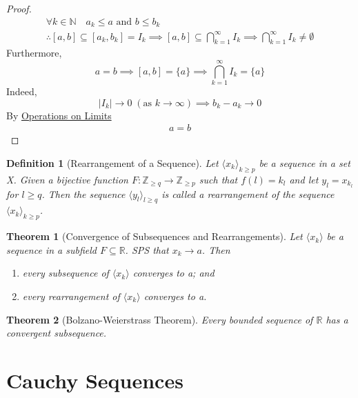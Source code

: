 \documentclass[11pt, oneside]{book}
\theoremstyle{break}
\newtheorem{thm}{Theorem}[section]
\newtheorem*{proof}{Proof}
\newtheorem{defn}{Definition}[section]
\newcommand{\bb}[1]{\mathbb{#1}}			%
\begin{document}
\begin{proof}
\begin{gather*}
		\forall k \in \bb{N} \quad a_k \leq a \text{ and } b \leq b_k \\
		\therefore [a, b] \subseteq [a_k, b_k] = I_k
		\implies [a, b] \subseteq \bigcap\limits_{k=1}^\infty I_k \implies \bigcap\limits_{k=1}^\infty I_k \neq \emptyset
	\end{gather*}
	Furthermore,
	\begin{equation*}
		a = b \implies [a, b] = \{a\} \implies \bigcap\limits_{k=1}^\infty I_k = \{a\}
	\end{equation*}
	Indeed,
	\begin{equation*}
		|I_k| \to 0 \; (\text{as } k \to \infty) \implies b_k - a_k \to 0
	\end{equation*}
	By \hyperref[operations_limits]{Operations on Limits}
	\begin{gather*}
		a = b
	\end{gather*}
\end{proof}

\begin{defn}[Rearrangement of a Sequence]
	Let $\langle x_k \rangle_{k \geq p}$ be a sequence in a set X. Given a bijective function $F: \bb{Z}_{\geq q} \to \bb{Z}_{\geq p}$ such that $f(l) = k_l$ and let $y_l = x_{k_l}$ for $l \geq q$. Then the sequence $\langle y_l \rangle_{l \geq q}$ is called a rearrangement of the sequence $\langle x_k \rangle_{k \geq p}$.
\end{defn}

\begin{thm}[Convergence of Subsequences and Rearrangements]
	Let $\langle x_k \rangle$ be a sequence in a subfield $F \subseteq \bb{R}$. SPS that $x_k \to a$. Then
	\begin{enumerate}
		\item every subsequence of $\langle x_k \rangle$ converges to a; and
		\item every rearrangement of $\langle x_k \rangle$ converges to a.
	\end{enumerate}
\end{thm}

\begin{thm}[Bolzano-Weierstrass Theorem]\label{bolzano-weierstass_R}
	Every bounded sequence of $\bb{R}$ has a convergent subsequence.
\end{thm}


\section{Cauchy Sequences}
\end{document}
